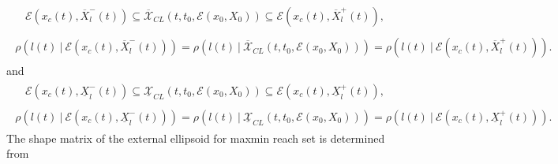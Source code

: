 \documentclass[letterpaper,10pt,english]{sphinxmanual}
\begin{document}
\label{main_source:equation-maxmininclusion}\begin{gather}
\begin{split}{\mathcal E}(x_c(t), \overline{X}^-_l(t))\subseteq\overline{{\mathcal X}}_{CL}(t,t_0,{\mathcal E}(x_0,X_0))
\subseteq {\mathcal E}(x_c(t), \overline{X}^+_l(t)),\end{split}\label{main_source-maxmininclusion}
\end{gather}\label{main_source:equation-maxmintightness}\begin{gather}
\begin{split}\rho(l(t) ~|~ {\mathcal E}(x_c(t), \overline{X}^-_l(t))) =
\rho(l(t) ~|~ \overline{{\mathcal X}}_{CL}(t, t_0, {\mathcal E}(x_0,X_0))) =
\rho(l(t) ~|~ {\mathcal E}(x_c(t), \overline{X}^+_l(t))) .\end{split}\label{main_source-maxmintightness}
\end{gather}
and
\label{main_source:equation-minmaxinclusion}\begin{gather}
\begin{split}{\mathcal E}(x_c(t), \underline{X}^-_l(t))\subseteq\underline{{\mathcal X}}_{CL}(t,t_0,{\mathcal E}(x_0,X_0))
\subseteq {\mathcal E}(x_c(t), \underline{X}^+_l(t)),\end{split}\label{main_source-minmaxinclusion}
\end{gather}\label{main_source:equation-minmaxtightness}\begin{gather}
\begin{split}\rho(l(t) ~|~ {\mathcal E}(x_c(t), \underline{X}^-_l(t))) =
\rho(l(t) ~|~ \underline{{\mathcal X}}_{CL}(t, t_0, {\mathcal E}(x_0,X_0))) =
\rho(l(t) ~|~ {\mathcal E}(x_c(t), \underline{X}^+_l(t))) .\end{split}\label{main_source-minmaxtightness}
\end{gather}
The shape matrix of the external ellipsoid for maxmin reach set is
determined from
\end{document}
